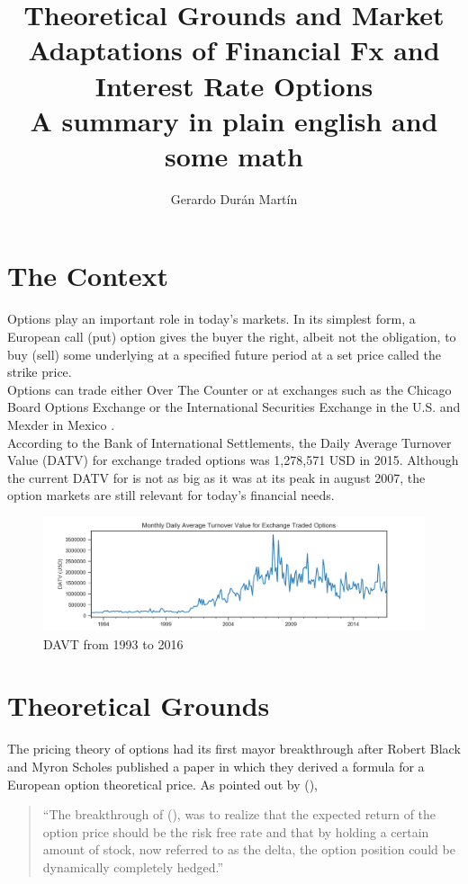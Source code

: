 \documentclass{article}
\title{Theoretical Grounds and Market Adaptations of Financial Fx and Interest Rate Options \\ \large A summary in plain english and some math}
\author{Gerardo Dur\'an Mart\'in}
\newcommand{\Mycite}[1]{%
 \citeauthor{#1}(\citeyear{#1})}
\begin{document}
\maketitle

 \graphicspath{ {images/} }

\section{The Context}
Options play an important role in today’s markets. In its simplest form, a European call (put) option gives the buyer the right, albeit not the obligation, to buy (sell) some underlying at a specified future period at a set price called the strike price.\\

Options can trade either Over The Counter or at exchanges such as the Chicago Board Options Exchange or the International Securities Exchange in the U.S.\cite{sec_listed} and Mexder in Mexico \citep{mexder} .\\

According to the Bank of International Settlements, the Daily Average Turnover Value (DATV) for exchange traded options was 1,278,571 USD in 2015. Although the current DATV for is not as big as it was at its peak in august 2007, the option markets are still relevant for today's financial needs.

\begin{figure}[h]
    \centering
    \includegraphics[width=1.0\textwidth]{DAVT}
    \caption{DAVT from 1993 to 2016}
\end{figure}

\section{Theoretical Grounds}
The pricing theory of options had its first mayor breakthrough after Robert Black and Myron Scholes published a paper in which they derived a formula for a European option theoretical price. As pointed out by \Mycite{pre_bs},

\begin{quote}
``The breakthrough of \Mycite{black_scholes}, was to realize that the expected return of the option price should be the risk free rate and that by holding a certain amount of stock, now referred to as the delta, the option position could be dynamically completely hedged.''
\end{quote} 
\end{document}
